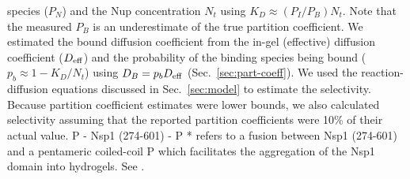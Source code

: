 \begin{table}[h!]
{  species ($P_N$) and the Nup concentration $N_t$ using
  $K_D \approx (P_I/P_B)N_t$. Note that the measured $P_B$ is an
  underestimate of the true partition coefficient. We estimated
  the bound diffusion
  coefficient  from the in-gel (effective)
  diffusion coefficient ($D_{\mathrm{eff}}$) and the probability of the
  binding species being bound ($p_b \approx 1-K_D/N_t$) using $D_B =
  p_bD_{\mathrm{eff}}$ (Sec.~\ref{sec:part-coeff}). We used the reaction-diffusion equations
  discussed in Sec.~\ref{sec:model} to estimate the selectivity.  Because
  partition coefficient estimates were lower bounds, we also
  calculated selectivity
  assuming that the reported
  partition coefficients were 10\% of their actual value. P -
  Nsp1 (274-601) - P * refers to a fusion between Nsp1 (274-601) and
  a pentameric coiled-coil P which facilitates the aggregation of
  the Nsp1 domain into hydrogels.  See \cite{kim15}.     \label{table:Gorlich}}                \end{table}
